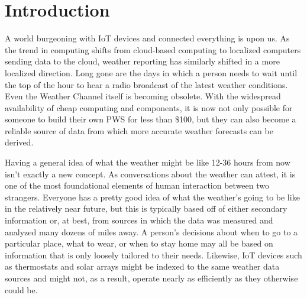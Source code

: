 \documentclass[sigconf]{acmart}
\begin{document}

\maketitle

\section{Introduction}

A world burgeoning with IoT devices and connected everything is upon us. As the trend in computing shifts from cloud-based computing to localized computers sending data to the cloud, weather reporting has similarly shifted in a more localized direction. Long gone are the days in which a person needs to wait until the top of the hour to hear a radio broadcast of the latest weather conditions. Even the Weather Channel itself is becoming obsolete. With the widespread availability of cheap computing and components, it is now not only possible for someone to build their own PWS for less than \$100, but they can also become a reliable source of data from which more accurate weather forecasts can be derived. 

Having a general idea of what the weather might be like 12-36 hours from now isn't exactly a new concept. As conversations about the weather can attest, it is one of the most foundational elements of human interaction between two strangers. Everyone has a pretty good idea of what the weather's going to be like in the relatively near future, but this is typically based off of either secondary information or, at best, from sources in which the data was measured and analyzed many dozens of miles away. A person's decisions about when to go to a particular place, what to wear, or when to stay home may all be based on information that is only loosely tailored to their needs. Likewise, IoT devices such as thermostats and solar arrays might be indexed to the same weather data sources and might not, as a result, operate nearly as efficiently as they otherwise could be. 
\end{document}
